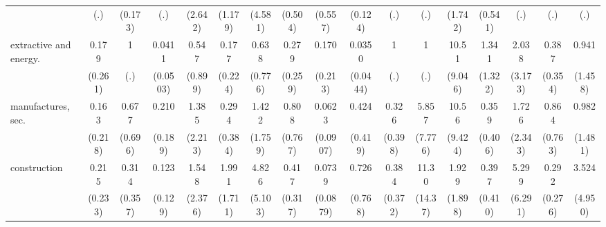 {\begin{tabular}{l*{16}{c}}
                    &         (.)         &     (0.173)         &         (.)         &     (2.642)         &     (1.179)         &     (4.581)         &     (0.504)         &     (0.557)         &     (0.124)         &         (.)         &         (.)         &     (1.742)         &     (0.541)         &         (.)         &         (.)         &         (.)         \\
[1em]
extractive and energy.&       0.179         &           1         &      0.0411\sym{**} &       0.547         &       0.177         &       0.638         &       0.279         &       0.170         &      0.0350\sym{**} &           1         &           1         &       10.51\sym{**} &       1.341         &       2.038         &       0.387         &       0.941         \\
                    &     (0.261)         &         (.)         &    (0.0503)         &     (0.899)         &     (0.224)         &     (0.776)         &     (0.259)         &     (0.213)         &    (0.0444)         &         (.)         &         (.)         &     (9.046)         &     (1.322)         &     (3.173)         &     (0.354)         &     (1.458)         \\
[1em]
manufactures, sec.  &       0.163         &       0.677         &       0.210         &       1.385         &       0.294         &       1.422         &       0.808         &      0.0623         &       0.424         &       0.326         &       5.857         &       10.56\sym{**} &       0.359         &       1.726         &       0.864         &       0.982         \\
                    &     (0.218)         &     (0.696)         &     (0.189)         &     (2.213)         &     (0.384)         &     (1.759)         &     (0.767)         &    (0.0907)         &     (0.419)         &     (0.398)         &     (7.776)         &     (9.424)         &     (0.406)         &     (2.343)         &     (0.763)         &     (1.481)         \\
[1em]
construction        &       0.215         &       0.314         &       0.123\sym{*}  &       1.548         &       1.991         &       4.826         &       0.417         &      0.0739\sym{*}  &       0.726         &       0.384         &       11.30         &       1.929         &       0.397         &       5.299         &       0.292         &       3.524         \\
                    &     (0.233)         &     (0.357)         &     (0.129)         &     (2.376)         &     (1.711)         &     (5.103)         &     (0.317)         &    (0.0879)         &     (0.768)         &     (0.372)         &     (14.37)         &     (1.898)         &     (0.410)         &     (6.291)         &     (0.276)         &     (4.950)         \\

\end{tabular}}
